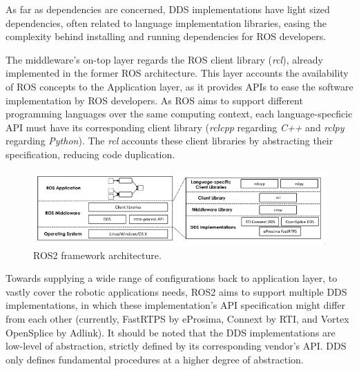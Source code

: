 As far as dependencies are concerned, DDS implementations have light sized dependencies, often related to language implementation libraries, easing the complexity behind installing and running dependencies for ROS developers. \cite{ros-on-dds}

The middleware's on-top layer regards the ROS client library (\textit{rcl}), already implemented in the former ROS architecture. This layer accounts the availability of ROS concepts to the Application layer, as it provides APIs to ease the software implementation by ROS developers. \cite{ros2documentation} As ROS aims to support different programming languages over the same computing context, each language-specficic API must have its corresponding client library (\textit{rclcpp} regarding \textit{C++} and \textit{rclpy} regarding \textit{Python}). The \textit{rcl} accounts these client libraries by abstracting their specification, reducing code duplication.   
\cite{rcl, casini2019response}


\begin{figure}[H]
    \centering
    \includegraphics[width=\linewidth]{images/ros2-architecture.png}
    \caption{ROS2 framework architecture.}
    \label{fig:ros2-architecture}
\end{figure}

Towards supplying a wide range of configurations back to application layer, to vastly cover the robotic applications needs, ROS2 aims to support multiple DDS implementations, in which these implementation's API specification might differ from each other (currently, FastRTPS by eProsima, Connext by RTI, and Vortex OpenSplice by Adlink). It should be noted that the DDS implementations are low-level of abstraction, strictly defined by its corresponding vendor's API. DDS only defines fundamental procedures at a higher degree of abstraction.  

